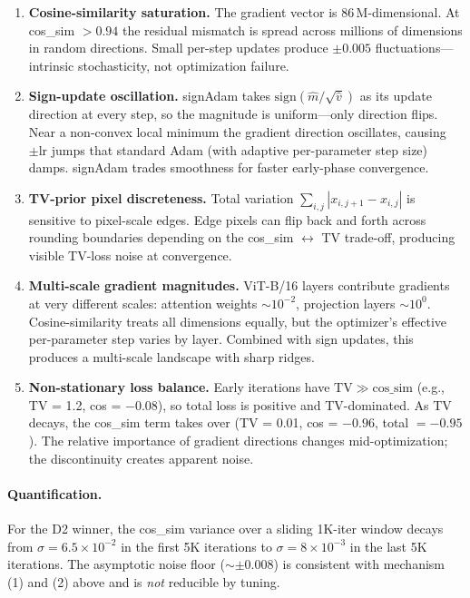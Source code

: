\documentclass[11pt,a4paper]{article}
\begin{document}
\begin{enumerate}[leftmargin=2em]
  \item \textbf{Cosine-similarity saturation.} The gradient vector is 86\,M-dimensional. At cos\_sim $> 0.94$ the residual mismatch is spread across millions of dimensions in random directions. Small per-step updates produce $\pm 0.005$ fluctuations---intrinsic stochasticity, not optimization failure.
  \item \textbf{Sign-update oscillation.} signAdam takes $\mathrm{sign}(\hat m / \sqrt{\hat v})$ as its update direction at every step, so the magnitude is uniform---only direction flips. Near a non-convex local minimum the gradient direction oscillates, causing $\pm \mathrm{lr}$ jumps that standard Adam (with adaptive per-parameter step size) damps. signAdam trades smoothness for faster early-phase convergence.
  \item \textbf{TV-prior pixel discreteness.} Total variation $\sum_{i,j} |x_{i,j+1} - x_{i,j}|$ is sensitive to pixel-scale edges. Edge pixels can flip back and forth across rounding boundaries depending on the cos\_sim $\leftrightarrow$ TV trade-off, producing visible TV-loss noise at convergence.
  \item \textbf{Multi-scale gradient magnitudes.} ViT-B/16 layers contribute gradients at very different scales: attention weights $\sim 10^{-2}$, projection layers $\sim 10^{0}$. Cosine-similarity treats all dimensions equally, but the optimizer's effective per-parameter step varies by layer. Combined with sign updates, this produces a multi-scale landscape with sharp ridges.
  \item \textbf{Non-stationary loss balance.} Early iterations have $\mathrm{TV} \gg \mathrm{cos\_sim}$ (e.g., TV = 1.2, cos = $-0.08$), so total loss is positive and TV-dominated. As TV decays, the cos\_sim term takes over (TV = 0.01, cos = $-0.96$, total $= -0.95$). The relative importance of gradient directions changes mid-optimization; the discontinuity creates apparent noise.
\end{enumerate}

\paragraph{Quantification.} For the D2 winner, the cos\_sim variance over a sliding 1K-iter window decays from $\sigma = 6.5\times 10^{-2}$ in the first 5K iterations to $\sigma = 8\times 10^{-3}$ in the last 5K iterations. The asymptotic noise floor ($\sim \pm 0.008$) is consistent with mechanism (1) and (2) above and is \emph{not} reducible by tuning.
\end{document}
